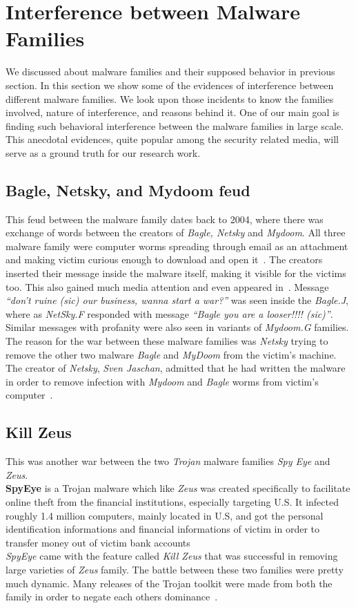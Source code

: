 \section{Interference between Malware Families}
\label{sec:Interference between Malware Families}
We discussed about malware families and their supposed behavior in previous section.
In this section we show some of the evidences of interference between different malware families.
We look upon those incidents to know the families involved, nature of interference, and reasons behind it.
One of our main goal is finding such behavioral interference between the malware families in large scale.
This anecdotal evidences, quite popular among the security related media, will serve as a ground truth for our research work.
\subsection{Bagle, Netsky, and Mydoom feud}
\label{sub:Bagle, Netsky, and Mydoom feud}
This feud between the malware family dates back to 2004, where there was exchange of words between the creators of \emph{Bagle, Netsky} and \emph{Mydoom}.
All three malware family were computer worms spreading through email as an attachment and making victim curious enough to download and open it~\cite[]{wikinetsky}.
The creators inserted their message inside the malware itself, making it visible for the victims too. This also gained much media attention and even appeared in~\cite[BBC]{bbccover}.
Message \emph{``don't ruine (sic) our business, wanna start a war?''} was seen inside the \emph{Bagle.J}, where as \emph{NetSky.F} responded with message \emph{``Bagle \- you are a looser!!!! (sic)''}.
Similar messages with profanity were also seen in variants of \emph{Mydoom.G} families.\\
The reason for the war between these malware families was \emph{Netsky} trying to remove the other two malware \emph{Bagle} and \emph{MyDoom} from the victim's machine.
The creator of \emph{Netsky}, \emph{Sven Jaschan}, admitted that he had written the malware in order to remove infection with \emph{Mydoom} and \emph{Bagle} worms from victim's computer~\cite[]{wikinetsky}.\\
\subsection{Kill Zeus}
\label{sub:Kill Zeus}
This was another war between the two \emph{Trojan} malware families \emph{Spy Eye} and \emph{Zeus}.\\
\textbf{SpyEye} is a Trojan malware which like \emph{Zeus} was created specifically to facilitate online theft from the financial institutions, especially targeting U.S.
It infected roughly 1.4 million computers, mainly located in U.S, and got the personal identification informations and financial informations of victim in order to transfer money out of victim bank accounts~\cite[]{fbispyeye} \\
\textit{SpyEye} came with the feature called \emph{Kill Zeus} that was successful in removing large varieties of \emph{Zeus} family.
The battle between these two families were pretty much dynamic.
Many releases of the Trojan toolkit were made from both the family in order to negate each others dominance~\cite[]{sanszeus}.
